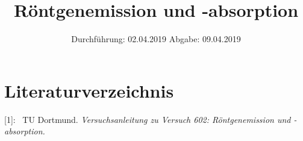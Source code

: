 

\subject{Nr. 602}
\title{Röntgenemission und -absorption}
\date{%
  Durchführung: 02.04.2019
  \hspace{3em}
  Abgabe: 09.04.2019
}



\maketitle
\thispagestyle{empty}
\tableofcontents
\newpage






\section{Literaturverzeichnis}

[1]: \ TU Dortmund. \textit{Versuchsanleitung zu Versuch 602:
Röntgenemission und -absorption.}\newline

\printbibliography{}


